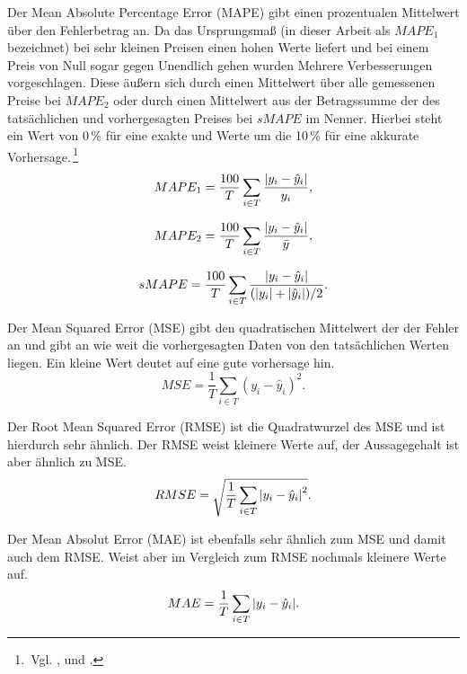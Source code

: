 Der Mean Absolute Percentage Error (MAPE) gibt einen prozentualen Mittelwert über den Fehlerbetrag an. Da das Ursprungsmaß (in dieser Arbeit als $MAPE_1$ bezeichnet) bei sehr kleinen Preisen einen hohen Werte liefert und bei einem Preis von Null sogar gegen Unendlich gehen wurden Mehrere Verbesserungen vorgeschlagen. Diese äußern sich durch einen Mittelwert über alle gemessenen Preise bei $MAPE_2$ oder durch einen Mittelwert aus der Betragssumme der des tatsächlichen und vorhergesagten Preises bei $sMAPE$ im Nenner. Hierbei steht ein Wert von 0\,\% für eine exakte und Werte um die 10\,\% für eine akkurate Vorhersage.\,\footnote{\,Vgl. \citet[17]{Bobinaite2016}, \citet[2105]{Amjady2009} und \citet[894]{Lago2018}.}   
\begin{equation}
MAPE_1= \frac{100}{T} \sum\limits_{i \in T} \frac{\abs{y_i-\hat{y}_i}}{y_i},
\label{gl:MAPE_1}
\end{equation}

\begin{equation}
MAPE_2= \frac{100}{T} \sum\limits_{i \in T} \frac{\abs{y_i-\hat{y}_i}}{\bar{y}},
\label{gl:MAPE_2}
\end{equation}

\begin{equation}
sMAPE= \frac{100}{T} \sum\limits_{i \in T} \frac{\abs{y_i-\hat{y}_i}}{(\abs{y_i} + \abs{\hat{y}_i}) / 2}.
\label{gl:sMAPE}
\end{equation}

Der Mean Squared Error (MSE) gibt den quadratischen Mittelwert der der Fehler an und gibt an wie weit die vorhergesagten Daten von den tatsächlichen Werten liegen. Ein kleine Wert deutet auf eine gute vorhersage hin.\,
\begin{equation}
MSE= \frac{1}{T} \sum\limits_{i \in T} (y_i-\hat{y}_i)^2.
\label{gl:MSE}
\end{equation}


Der Root Mean Squared Error (RMSE) ist die Quadratwurzel des MSE und ist hierdurch sehr ähnlich. Der RMSE weist kleinere Werte auf, der Aussagegehalt ist aber ähnlich zu MSE.
\begin{equation}
RMSE= \sqrt{ \frac{1}{T} \sum\limits_{i \in T} \abs{y_i-\hat{y}_i}^2}.
\label{gl:RMSE}
\end{equation}

Der Mean Absolut Error (MAE) ist ebenfalls sehr ähnlich zum MSE und damit auch dem RMSE. Weist aber im Vergleich zum RMSE nochmals kleinere Werte auf.
\begin{equation}
MAE= \frac{1}{T} \sum\limits_{i \in T} \abs{y_i-\hat{y}_i}.
\label{gl:MAE}
\end{equation}


